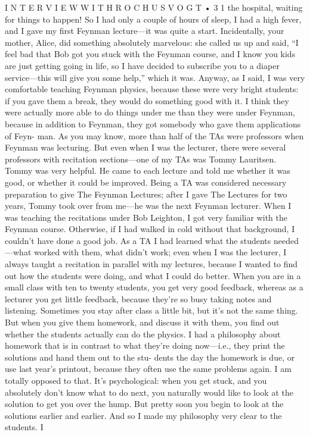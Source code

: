 \documentclass[10pt,oneside]{article}
\begin{document}
I N T E R V I E W  W I T H  R O C H U S  V O G T • 3 1 the hospital, waiting for things to happen! So I had only a couple of hours of sleep, I had a high fever, and I gave my first Feynman lecture---it was quite a start. Incidentally, your mother, Alice, did something absolutely marvelous: she called us up and said, “I feel bad that Bob got you stuck with the Feynman course, and I know you kids are just getting going in life, so I have decided to subscribe you to a diaper service---this will give you some help,” which it was. Anyway, as I said, I was very comfortable teaching Feynman physics, because these were very bright students: if you gave them a break, they would do something good with it. I think they were actually more able to do things under me than they were under Feynman, because in addition to Feynman, they got somebody who gave them applications of Feyn- man. As you may know, more than half of the TAs were professors when Feynman was lecturing. But even when I was the lecturer, there were several professors with recitation sections---one of my TAs was Tommy Lauritsen. Tommy was very helpful. He came to each lecture and told me whether it was good, or whether it could be improved. Being a TA was considered necessary preparation to give The Feynman Lectures; after I gave The Lectures for two years, Tommy took over from me---he was the next Feynman lecturer. When I was teaching the recitations under Bob Leighton, I got very familiar with the Feynman course. Otherwise, if I had walked in cold without that background, I couldn’t have done a good job. As a TA I had learned what the students needed---what worked with them, what didn’t work; even when I was the lecturer, I always taught a recitation in parallel with my lectures, because I wanted to find out how the students were doing, and what I could do better. When you are in a small class with ten to twenty students, you get very good feedback, whereas as a lecturer you get little feedback, because they’re so busy taking notes and listening. Sometimes you stay after class a little bit, but it’s not the same thing. But when you give them homework, and discuss it with them, you find out whether the students actually can do the physics. I had a philosophy about homework that is in contrast to what they’re doing now---i.e., they print the solutions and hand them out to the stu- dents the day the homework is due, or use last year’s printout, because they often use the same problems again. I am totally opposed to that. It’s psychological: when you get stuck, and you absolutely don’t know what to do next, you naturally would like to look at the solution to get you over the hump. But pretty soon you begin to look at the solutions earlier and earlier. And so I made my philosophy very clear to the students. I\par
\end{document}
